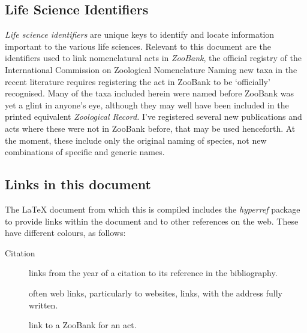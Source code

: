 \subsection{Life Science Identifiers }%
\label{ssec:introduction-lsid}

\emph{Life science identifiers} are unique keys to identify and locate information important to the various life sciences. Relevant to this document are the identifiers used to link nomenclatural acts in \emph{ZooBank}, the official registry of the International Commission on Zoological Nomenclature  Naming new taxa in the recent literature requires registering the act in ZooBank to be ‘officially’ recognised.
Many of the taxa included herein were named before ZooBank was yet a glint in anyone's eye, although they may well have been included in the printed equivalent \emph{Zoological Record.} I've registered several new publications and acts where these were not in ZooBank before, that may be used henceforth. At the moment, these include only the original naming of species, not new combinations of specific and generic names.

\subsection{Links in this document}%
\label{sub:introduction-links}

The \LaTeX{} document from which this  is compiled includes the \emph{hyperref} package to provide links within the document and to other references on the web. These have different colours, as follows:

\begin{description}
    \item[\textcolor{citelinkcolour}{Citation}] links from the year of a citation to its reference in the bibliography.
    \item[\textallsc{\textcolor{urllinkcolour}{URL}}] often web links, particularly to websites,  links,  with the address fully written.
    \item[{\upshape{}}] link to a ZooBank  for an act.
\end{description}

